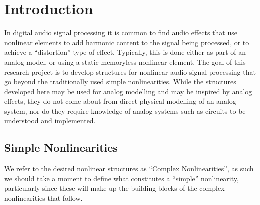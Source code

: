 \documentclass[twoside,a4paper]{article}
\title{\papertitle}
\affiliation{
\paperauthorA \,}
{\href{http://ccrma.stanford.edu}{Center for Computer Research in Music and Acoustics} \\ Stanford University \\ Palo Alto, CA \\ {\tt \href{mailto:jatin@ccrma.stanford.edu}{jatin@ccrma.stanford.edu}}}
\newif\ifpdf
\begin{document}
\ifpdf %
  \DeclareGraphicsExtensions{.png,.jpg,.pdf}
\else  %
\fi

\maketitle
%
\begin{abstract}
We present an ongoing study of new and interesting
nonlinear structures for audio signal processing, intended to be
used for audio effects and synthesis. We give a brief discussion of
each structure, and present a series of open-source audio plugins that
implement the structures.
\end{abstract}

\section{Introduction} \label{sec:intro}
%
In digital audio signal processing it is common to find audio effects
that use nonlinear elements to add harmonic content to the signal being
processed, or to achieve a ``distortion'' type of effect. Typically, this
is done either as part of an analog model, or using a static memoryless
nonlinear element.
\newline\newline
%
The goal of this research project is to develop structures for nonlinear
audio signal processing that go beyond the traditionally used simple
nonlinearities. While the structures developed here may be used for
analog modelling and may be inspired by analog effects, they do not
come about from direct physical modelling of an analog system, nor
do they require knowledge of analog systems such as circuits to be
understood and implemented.

\subsection{Simple Nonlinearities} \label{sec:simple}
%
We refer to the desired nonlinear structures as ``Complex
Nonlinearities'', as such we should take a moment to define what
constitutes a ``simple'' nonlinearity, particularly since these will
make up the building blocks of the complex nonlinearities that follow.
\end{document}

